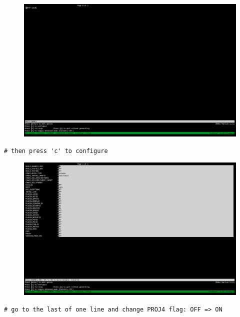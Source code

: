 \begin{itemize}
\begin{figure}[h]
\includegraphics[width=\linewidth]{2015/Aug/24/1pic.png}
\end{figure}

\pagebreak

\begin{lstlisting}[style=bashStyle]
# then press 'c' to configure
\end{lstlisting}

\begin{figure}[h]
\includegraphics[width=\linewidth]{2015/Aug/24/2pic.png}
\end{figure}

\pagebreak

\begin{lstlisting}[style=bashStyle]
# go to the last of one line and change PROJ4 flag: OFF => ON
\end{lstlisting}


\end{itemize}
